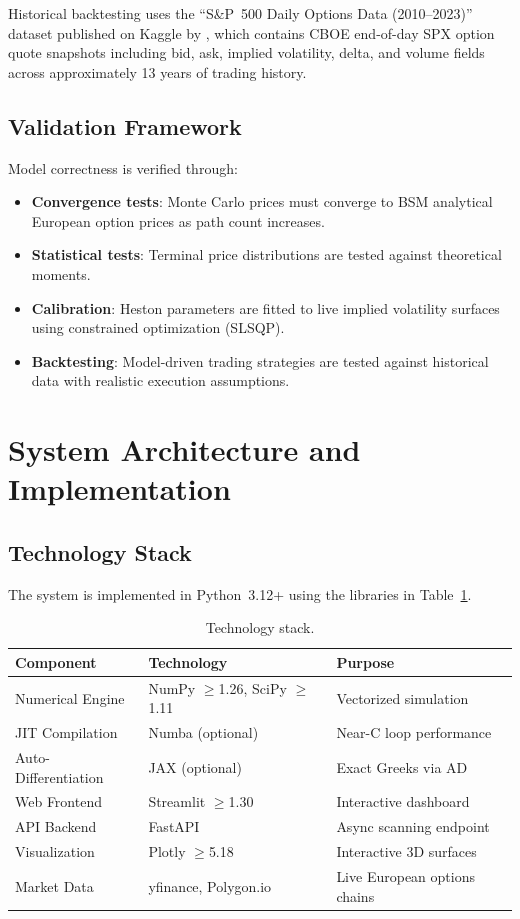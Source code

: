 \documentclass[12pt,a4paper]{article}
\begin{document}
Historical backtesting uses the ``S\&P~500 Daily Options Data (2010--2023)'' dataset published on Kaggle by \textcite{singh2024}, which contains CBOE end-of-day SPX option quote snapshots including bid, ask, implied volatility, delta, and volume fields across approximately 13 years of trading history.

\subsection{Validation Framework}

Model correctness is verified through:
\begin{itemize}
\item \textbf{Convergence tests}: Monte Carlo prices must converge to BSM analytical European option prices as path count increases.
\item \textbf{Statistical tests}: Terminal price distributions are tested against theoretical moments.
\item \textbf{Calibration}: Heston parameters are fitted to live implied volatility surfaces using constrained optimization (SLSQP).
\item \textbf{Backtesting}: Model-driven trading strategies are tested against historical data with realistic execution assumptions.
\end{itemize}

\section{System Architecture and Implementation}

\subsection{Technology Stack}

The system is implemented in Python~3.12+ using the libraries in Table~\ref{tab:techstack}.

\begin{table}[H]
\centering
\caption{Technology stack.}
\label{tab:techstack}
\begin{tabular}{@{}lll@{}}
\toprule
\textbf{Component} & \textbf{Technology} & \textbf{Purpose} \\
\midrule
Numerical Engine & NumPy $\geq$1.26, SciPy $\geq$1.11 & Vectorized simulation \\
JIT Compilation & Numba (optional) & Near-C loop performance \\
Auto-Differentiation & JAX (optional) & Exact Greeks via AD \\
Web Frontend & Streamlit $\geq$1.30 & Interactive dashboard \\
API Backend & FastAPI & Async scanning endpoint \\
Visualization & Plotly $\geq$5.18 & Interactive 3D surfaces \\
Market Data & yfinance, Polygon.io & Live European options chains \\
\bottomrule
\end{tabular}
\end{table}
\end{document}
